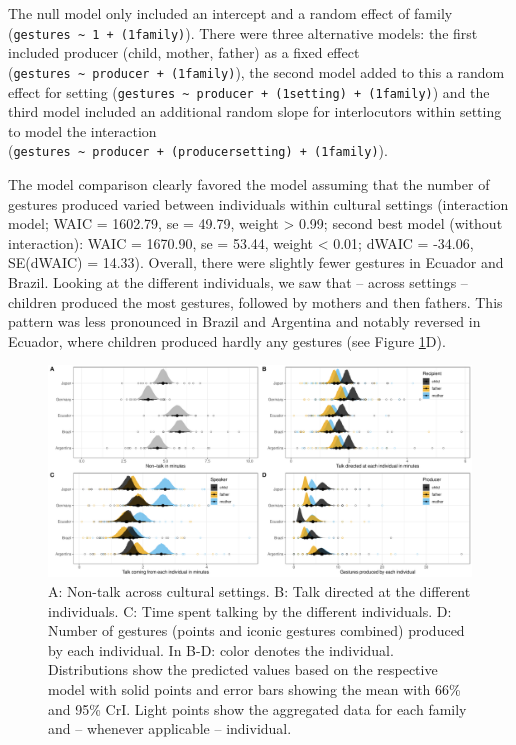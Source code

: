 \documentclass[
  man,floatsintext]{apa6}
\begin{document}
The null model only included an intercept and a random effect of family (\texttt{gestures\ \textasciitilde{}\ 1\ +\ (1\textbar{}family)}). There were three alternative models: the first included producer (child, mother, father) as a fixed effect (\texttt{gestures\ \textasciitilde{}\ producer\ +\ (1\textbar{}family)}), the second model added to this a random effect for setting (\texttt{gestures\ \textasciitilde{}\ producer\ +\ (1\textbar{}setting)\ +\ (1\textbar{}family)}) and the third model included an additional random slope for interlocutors within setting to model the interaction (\texttt{gestures\ \textasciitilde{}\ producer\ +\ (producer\textbar{}setting)\ +\ (1\textbar{}family)}).

The model comparison clearly favored the model assuming that the number of gestures produced varied between individuals within cultural settings (interaction model; WAIC = 1602.79, se = 49.79, weight \textgreater{} 0.99; second best model (without interaction): WAIC = 1670.90, se = 53.44, weight \textless{} 0.01; dWAIC = -34.06, SE(dWAIC) = 14.33). Overall, there were slightly fewer gestures in Ecuador and Brazil. Looking at the different individuals, we saw that -- across settings -- children produced the most gestures, followed by mothers and then fathers. This pattern was less pronounced in Brazil and Argentina and notably reversed in Ecuador, where children produced hardly any gestures (see Figure \ref{fig:fig1}D).

\begin{figure}
\includegraphics[width=1\linewidth]{../visuals/fig1} \caption{A: Non-talk across cultural settings. B: Talk directed at the different individuals. C: Time spent talking by the different individuals. D: Number of gestures (points and iconic gestures combined) produced by each individual. In B-D: color denotes the individual. Distributions show the predicted values based on the respective model with solid points and error bars showing the mean with 66\% and 95\% CrI. Light points show the aggregated data for each family and -- whenever applicable -- individual.}\label{fig:fig1}
\end{figure}
\end{document}
